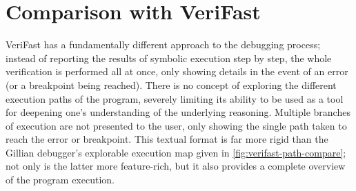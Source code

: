 \section{Comparison with VeriFast}

VeriFast has a fundamentally different approach to the debugging process;
instead of reporting the results of symbolic execution step by step, the whole
verification is performed all at once, only showing details in the event of an
error (or a breakpoint being reached). There is no concept of exploring the
different execution paths of the program, severely limiting its ability to be
used as a tool for deepening one's understanding of the underlying reasoning.
Multiple branches of execution are not presented to the user, only showing the
single path taken to reach the error or breakpoint. This textual format is far
more rigid than the Gillian debugger's explorable execution map given in
\autoref{fig:verifast-path-compare}; not only is the latter more feature-rich,
but it also provides a complete overview of the program execution.


